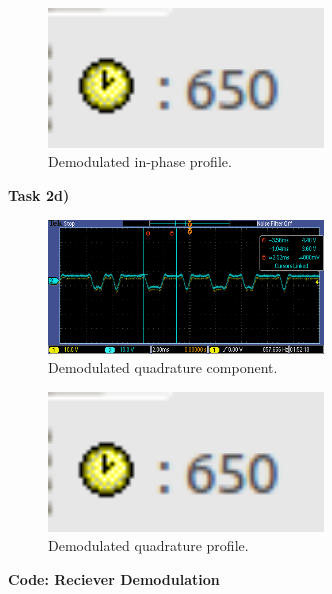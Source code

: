 \documentclass{article}
\begin{document}
\begin{figure}[h]
  \begin{center}
    \includegraphics[width=0.65\textwidth]{img/task_2_c_profile.png}
    \caption{Demodulated in-phase profile.}
  \end{center}
\end{figure}

\pagebreak
\textbf{Task 2d)}

\begin{figure}[h]
  \begin{center}
    \includegraphics[width=0.65\textwidth]{img/task_2_c_oscilloscope.png}
    \caption{Demodulated quadrature component.}
  \end{center}
\end{figure}

\begin{figure}[h]
  \begin{center}
    \includegraphics[width=0.65\textwidth]{img/task_2_c_profile.png}
    \caption{Demodulated quadrature profile.}
  \end{center}
\end{figure}

\pagebreak
\textbf{Code: Reciever Demodulation}
\end{document}
